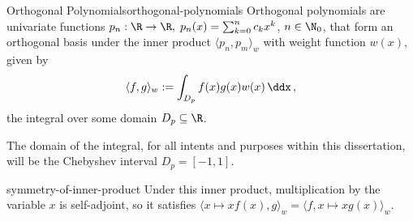 \begin{definition}{Orthogonal Polynomials}{orthogonal-polynomials}
  Orthogonal polynomials are univariate functions
  $p_n: \R \to \R, \; p_n(x) = \sum_{k=0}^{n} c_k x^k$, $n \in \N_0$,
  that form an orthogonal basis under the inner product $\langle p_n, p_m \rangle_w$ with weight function $w(x)$, given by
  $$\langle f, g \rangle_w := \int_{D_p} f(x) g(x) w(x) \,\ddx\,,$$
  the integral over some domain $D_p \subseteq \R$.
\end{definition}

The domain of the integral, for all intents and purposes within this dissertation, will be the Chebyshev interval $D_p = [-1, 1]$.

\begin{remark}{}{symmetry-of-inner-product}
  Under this inner product, multiplication by the variable $x$ is self-adjoint, so it satisfies $\langle x\mapsto xf(x), g \rangle_w = \langle f, x \mapsto xg(x)\rangle_w$.
\end{remark}
